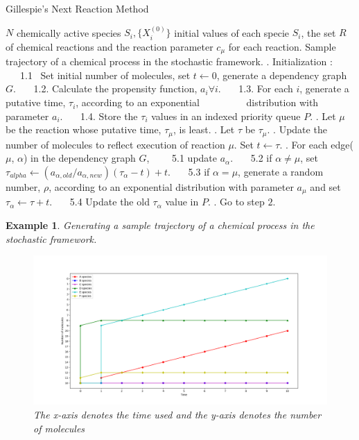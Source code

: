 \documentclass[11pt,a4paper]{article}
\newtheorem{example}[theorem]{Example}
\begin{document}
\begin{algorithm}[!h]                     %
\caption{Gillespie's Next Reaction Method}       %
\begin{algorithmic}                       %
\REQUIRE $N$ chemically active species $S_i, \{X_{i}^{(0)}\}$ initial values of each specie $S_i$, the set $R$ of chemical reactions and the reaction parameter $c_{\mu}$ for each reaction.
\ENSURE Sample trajectory of a chemical process in the stochastic framework.
    . Initialization :
      \STATE \ \ \ 1.1  \ Set initial number of molecules, set $t \leftarrow 0$, generate a dependency graph $G$.
      \STATE \ \ \ 1.2. Calculate the propensity function, $a_{i} \forall i$.
      \STATE \ \ \ 1.3. For each $i$, generate a putative time, $\tau_{i}$, according to an exponential
      \STATE \ \ \ \ \ \ \ \ \ distribution with parameter $a_{i}$.
      \STATE \ \ \ 1.4. Store the $\tau_{i}$ values in an indexed priority queue $P.$
    . Let $\mu$ be the reaction whose putative time, $\tau_{\mu}$, is least.
    . Let $\tau$ be $\tau_{\mu}$.
    . Update the number of molecules to reflect execution of reaction $\mu$. Set $t \leftarrow \tau$.
    . For each edge($\mu$, $\alpha$) in the dependency graph $G$,
    \STATE \ \ \ \ 5.1 update $a_{\alpha}.$
    \STATE \ \ \ 5.2 if $\alpha \neq \mu$, set $\tau_{alpha} \leftarrow (a_{\alpha,old}/a_{\alpha, new})(\tau_{\alpha} - t) + t.$
    \STATE \ \ \ 5.3 if $\alpha = \mu$, generate a random number, $\rho$, according to an exponential distribution
    with parameter $a_{\mu}$ and set $\tau_{\alpha} \leftarrow \tau + t.$
    \STATE \ \ \ 5.4 Update the old $\tau_{\alpha}$ value in $P$.
    . Go to step $2$.
\ENDWHILE
\end{algorithmic}
\end{algorithm}

\begin{example}{Generating a sample trajectory of a chemical process in the stochastic framework.}
    \begin{figure}[!h]
    \centering
    \includegraphics[width=1\textwidth]{Images/Figure_1_Next_reaction.png}
    \caption{The x-axis denotes the time used and the y-axis denotes the number of molecules}
    \label{fig: sample trajectory}
    \end{figure}
\end{example}
\end{document}

